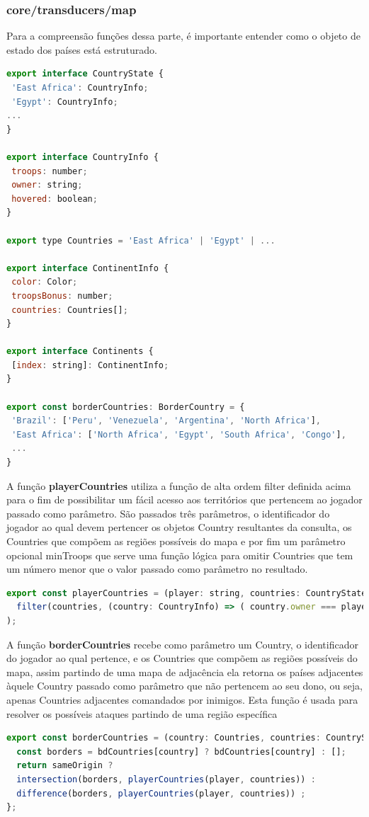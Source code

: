\documentclass[rel_mlp]{iiufrgs}
\begin{document}
\subsubsection{core/transducers/map}

Para a compreensão funções dessa parte, é importante entender como o objeto de estado dos países está estruturado.
\begin{lstlisting}[language=JavaScript]
export interface CountryState {
 'East Africa': CountryInfo;
 'Egypt': CountryInfo;
...
}

export interface CountryInfo {
 troops: number;
 owner: string;
 hovered: boolean;
}

export type Countries = 'East Africa' | 'Egypt' | ...

export interface ContinentInfo {
 color: Color;
 troopsBonus: number;
 countries: Countries[];
}

export interface Continents {
 [index: string]: ContinentInfo;
}

export const borderCountries: BorderCountry = {
 'Brazil': ['Peru', 'Venezuela', 'Argentina', 'North Africa'],
 'East Africa': ['North Africa', 'Egypt', 'South Africa', 'Congo'],
 ...
}
\end{lstlisting}

A função \textbf{playerCountries} utiliza a função de alta ordem filter definida acima para o fim de possibilitar um fácil acesso aos territórios que pertencem ao jogador passado como parâmetro. São passados três parâmetros, o identificador do jogador ao qual devem pertencer os objetos Country resultantes da consulta, os Countries que compõem as regiões possíveis do mapa e por fim um parâmetro opcional minTroops que serve uma função lógica para omitir Countries que tem um número menor que o valor passado como parâmetro no resultado.

\begin{lstlisting}[language=JavaScript]
export const playerCountries = (player: string, countries: CountryState, minTroops: number = 0) => (
  filter(countries, (country: CountryInfo) => ( country.owner === player && country.troops > minTroops))
);
\end{lstlisting}

A função \textbf{borderCountries} recebe como parâmetro um Country, o identificador do jogador ao qual pertence, e os Countries que compõem as regiões possíveis do mapa, assim partindo de uma mapa de adjacência ela retorna os países adjacentes àquele Country passado como parâmetro que não pertencem ao seu dono, ou seja, apenas Countries adjacentes comandados por inimigos. Esta função é usada para resolver os possíveis ataques partindo de uma região específica
\begin{lstlisting}[language = JavaScript]
export const borderCountries = (country: Countries, countries: CountryState, player: string, sameOrigin: boolean = true) => {
  const borders = bdCountries[country] ? bdCountries[country] : [];
  return sameOrigin ?
  intersection(borders, playerCountries(player, countries)) :
  difference(borders, playerCountries(player, countries)) ;
};
\end{lstlisting}
\end{document}
